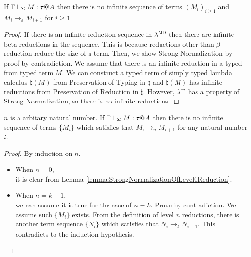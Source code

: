 \begin{lemma}
    \label{lemma:StrongNormalizationOfLevel0Reduction}
    If \( \G\V M:\tau@A \) then there is no infinite sequence of terms $(M_i)_{i\ge1}$ and $M_i \longrightarrow_\varepsilon M_{i+1}$ for $i\ge 1$
\end{lemma}

\begin{proof}
    If there is an infinite reduction sequence in $\lambda^{\text{MD}}$ then
    there are infinite beta reductions in the sequence.  This is because
    reductions other than $\beta$-reduction reduce the size of a term.  Then,
    we show Strong Normalization by proof by contradiction.  We assume that
    there is an infinite reduction in a typed \LMD from typed term $M$.  We can
    construct a typed term of simply typed lambda calculus $\natural(M)$ from
    Preservation of Typing in $\natural$ and $\natural(M)$ has infinite
    reductions from Preservation of Reduction in $\natural$.  However,
    $\lambda^\to$ has a property of Strong Normalization, so there is no
    infinite reductions.
\end{proof}

\begin{lemma}
    \label{lemma:StrongNormalizationOfLevelnReduction}
    \( n \) is a arbitary natural number.
    If \( \G\V M:\tau@A \) then there is no infinite sequence of terms $\{M_i\}$ which satisfies that $M_i \longrightarrow_n M_{i+1}$ for any natural number \( i \).
\end{lemma}

\begin{proof}
    By induction on \( n \).
    \begin{itemize}
        \item When \( n = 0 \), \\
            it is clear from Lemma \ref{lemma:StrongNormalizationOfLevel0Reduction}.
        \item When \( n = k + 1 \), \\
            we can assume it is true for the case of \( n = k \).  Prove by
            contradiction. We assume such \(\{M_i\}\) exists. From the
            definition of level \( n \) reductions, there is another term
            sequence \( \{ N_i \} \) which satisfies that \( N_i
            \longrightarrow_k N_{i+1} \). This contradicts to the induction
            hypothesis.
    \end{itemize}
\end{proof}

